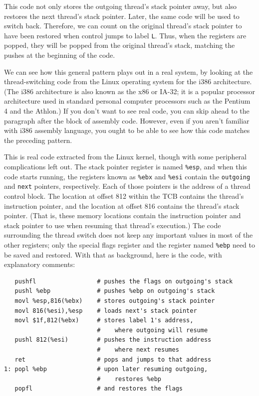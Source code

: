 This code not only stores the outgoing thread's stack pointer
away, but also restores the next thread's stack pointer.  Later, the
same code will be used to switch back.  Therefore, we can count on the
original thread's stack pointer to have been restored when control
jumps to label \verb|L|.  Thus, when the registers are popped, they
will be popped from the original thread's stack, matching the pushes
at the beginning of the code.

We can see how this general pattern plays out in a real system, by
looking at the thread-switching code from the Linux operating system
for the i386 architecture. (The i386 architecture is also known as the
x86 or IA-32; it is a popular processor architecture used in
standard personal computer processors such as the Pentium 4 and the
Athlon.)  If you don't want to see real code, you can skip ahead to
the paragraph after the block of assembly code.  However, even if you aren't familiar with i386 assembly language, you
ought to be able to see how this code matches the preceding pattern.

This
is real code extracted from the Linux kernel, though with some
peripheral complications left out.  The
stack pointer register is named \verb|%esp|, and when this code starts running, the
registers known as \verb|%ebx| and \verb|%esi| contain the \verb|outgoing|
and \verb|next| pointers, respectively.  Each of those pointers is the
address of a
thread control block. The location at offset 812 within the TCB contains
the thread's instruction pointer, and the location at offset 816 contains
the thread's stack pointer.  (That is, these memory locations contain
the instruction pointer and stack pointer to use when resuming that
thread's execution.)  The code surrounding the thread switch does not
keep any important values in most of the other registers; only the
special flags register and the register named \verb|%ebp| need to
be saved and restored.  With that as background, here is the
code, with explanatory comments:
\begin{verbatim}
   pushfl                 # pushes the flags on outgoing's stack
   pushl %ebp             # pushes %ebp on outgoing's stack
   movl %esp,816(%ebx)    # stores outgoing's stack pointer
   movl 816(%esi),%esp    # loads next's stack pointer
   movl $1f,812(%ebx)     # stores label 1's address,
                          #    where outgoing will resume
   pushl 812(%esi)        # pushes the instruction address
                          #    where next resumes
   ret                    # pops and jumps to that address
1: popl %ebp              # upon later resuming outgoing,
                          #    restores %ebp
   popfl                  # and restores the flags
\end{verbatim}

